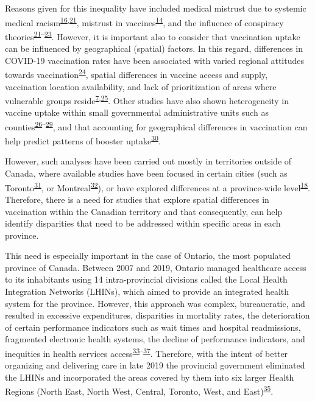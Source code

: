 \documentclass[
]{article}
\begin{document}
Reasons given for this inequality have included medical mistrust due to
systemic medical
racism\textsuperscript{\protect\hyperlink{ref-stoler2021}{16},\protect\hyperlink{ref-mosby2021}{21}},
mistrust in
vaccines\textsuperscript{\protect\hyperlink{ref-willis2021}{14}}, and
the influence of conspiracy
theories\textsuperscript{\protect\hyperlink{ref-mosby2021}{21}--\protect\hyperlink{ref-freeman2020}{23}}.
However, it is important also to consider that vaccination uptake can be
influenced by geographical (spatial) factors. In this regard,
differences in COVID-19 vaccination rates have been associated with
varied regional attitudes towards
vaccination\textsuperscript{\protect\hyperlink{ref-malik2020}{24}},
spatial differences in vaccine access and supply, vaccination location
availability, and lack of prioritization of areas where vulnerable
groups
reside\textsuperscript{\protect\hyperlink{ref-bogoch2022}{7},\protect\hyperlink{ref-nguyen2021}{25}}.
Other studies have also shown heterogeneity in vaccine uptake within
small governmental administrative units such as
counties\textsuperscript{\protect\hyperlink{ref-mollalo2021}{26}--\protect\hyperlink{ref-bhuiyan2022}{29}},
and that accounting for geographical differences in vaccination can help
predict patterns of booster
uptake\textsuperscript{\protect\hyperlink{ref-wood2022}{30}}.

However, such analyses have been carried out mostly in territories
outside of Canada, where available studies have been focused in certain
cities (such as
Toronto\textsuperscript{\protect\hyperlink{ref-choi2021}{31}}, or
Montreal\textsuperscript{\protect\hyperlink{ref-mckinnon2021}{32}}), or
have explored differences at a province-wide
level\textsuperscript{\protect\hyperlink{ref-guay2022}{18}}. Therefore,
there is a need for studies that explore spatial differences in
vaccination within the Canadian territory and that consequently, can
help identify disparities that need to be addressed within specific
areas in each province.

This need is especially important in the case of Ontario, the most
populated province of Canada. Between 2007 and 2019, Ontario managed
healthcare access to its inhabitants using 14 intra-provincial divisions
called the Local Health Integration Networks (LHINs), which aimed to
provide an integrated health system for the province. However, this
approach was complex, bureaucratic, and resulted in excessive
expenditures, disparities in mortality rates, the deterioration of
certain performance indicators such as wait times and hospital
readmissions, fragmented electronic health systems, the decline of
performance indicators, and inequities in health services
access\textsuperscript{\protect\hyperlink{ref-tsasis2012}{33}--\protect\hyperlink{ref-lysyk2016}{37}}.
Therefore, with the intent of better organizing and delivering care in
late 2019 the provincial government eliminated the LHINs and
incorporated the areas covered by them into six larger Health Regions
(North East, North West, Central, Toronto, West, and
East)\textsuperscript{\protect\hyperlink{ref-dong2022}{35}}.
\end{document}
